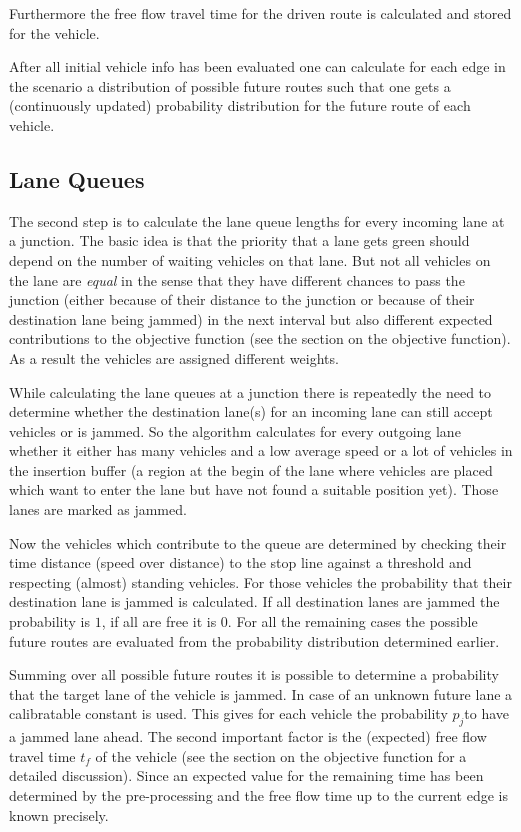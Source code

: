 \documentclass[sigconf,authordraft]{acmart}
\begin{document}
Furthermore the free flow travel time for the driven route is calculated and stored
for the vehicle.

After all initial vehicle info has been evaluated one can calculate for each
edge in the scenario a distribution of possible future routes such that one 
gets a (continuously updated) probability distribution for the future route of each vehicle.

\subsection{Lane Queues}
The second step is to calculate the lane queue lengths for every incoming lane at a junction.
The basic idea is that the priority that a lane gets green should depend on the
number of waiting vehicles on that lane. But not all vehicles on the lane are
\emph{equal} in the sense that they have different chances to pass the junction
(either because of their distance to the junction or because of their destination
lane being jammed) in the next interval but also different expected contributions
to the objective function (see the section on the objective function). As a result 
the vehicles are assigned different weights.

While calculating the lane queues at a junction there is repeatedly the need to determine
whether the destination lane(s) for an incoming lane can still accept vehicles or is jammed.
So the algorithm calculates for every outgoing lane whether it either has many vehicles
and a low average speed or a lot of vehicles in the insertion buffer (a region at the begin
of the lane where vehicles are placed which want to enter the lane but have not found 
a suitable position yet). Those lanes are marked as jammed.

Now the vehicles which contribute to the queue are determined by checking their time distance
(speed over distance) to the stop line against a threshold and respecting (almost) standing vehicles.
For those vehicles the probability that their destination lane is jammed is calculated. If all destination
lanes are jammed the probability is $1$, if all are free it is $0$. For all the remaining cases the 
possible future routes are evaluated from the probability distribution determined earlier.

Summing over all possible future routes it is possible to determine a probability that the target lane 
of the vehicle is jammed. In case of an unknown future lane a calibratable constant is used. This
gives for each vehicle the probability $p_j$to have a jammed lane ahead. The second important
factor is the (expected) free flow travel time $t_f$ of the vehicle (see the section on the objective 
function for a detailed discussion). Since an expected value for the remaining time has been determined
by the pre-processing and the free flow time up to the current edge is known precisely.
\end{document}
